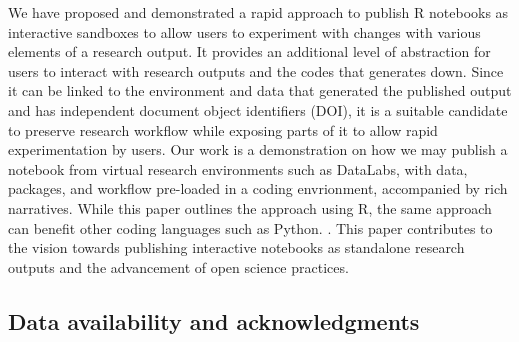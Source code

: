 We have proposed and demonstrated a rapid approach to publish R \DIFdelbegin {}\DIFdelend \DIFaddbegin {}\DIFaddend notebooks as interactive sandboxes to allow users to experiment with
changes with various elements of a research output. It provides an
additional level of abstraction for users to interact with research
outputs and the codes that generates down. Since it can be linked to the
environment and data that generated the published output and has
independent document object identifiers (DOI), it is a suitable
candidate to preserve research workflow while exposing parts of it to
allow rapid experimentation by users. Our work is a demonstration on how
we may publish a notebook from virtual research environments such as
DataLabs, with data, packages, and workflow pre-loaded in a coding
envrionment, accompanied by rich narratives. While this paper outlines
the approach using R, the same approach can benefit other coding
languages such as Python. \DIFdelbegin {}\emph{} %
\emph{}%
\DIFdelend \DIFaddbegin {}  \DIFaddend . This paper contributes to
the vision towards publishing interactive notebooks as standalone
research outputs and the advancement of open science practices.

\DIFdelbegin %
\DIFdelend \DIFaddbegin \hypertarget{data-availability-and-acknowledgments}{%
\subsection{Data availability and
acknowledgments}\label{data-availability-and-acknowledgments}}
\DIFaddend 


